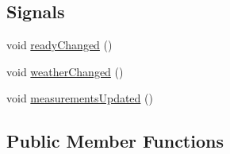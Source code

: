 \subsection*{Signals}
\begin{DoxyCompactItemize}
\item 
void \hyperlink{class_app_model_a574c2bd6f5c92ac9268107f8399989cb}{ready\+Changed} ()
\item 
void \hyperlink{class_app_model_a83e61455ed5672333b0db45f3f86417c}{weather\+Changed} ()
\item 
void \hyperlink{class_app_model_a1d9a24aeaab75b815f6500e9521dc091}{measurements\+Updated} ()
\end{DoxyCompactItemize}
\subsection*{Public Member Functions}
